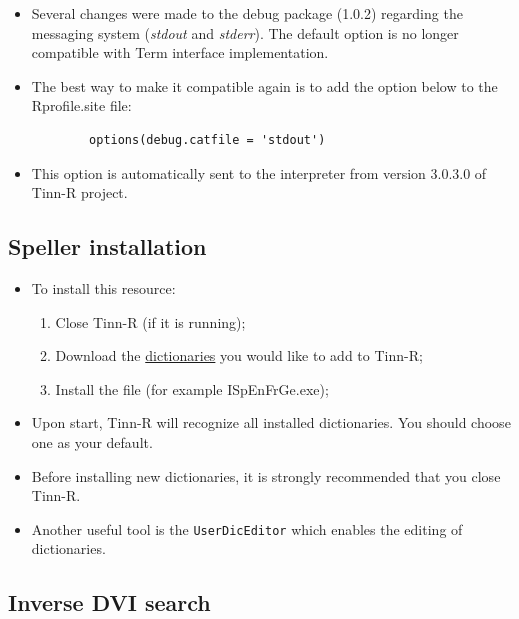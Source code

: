 \begin{itemize}
  \item Several changes were made to the debug package (1.0.2) regarding
    the messaging system (\textit{stdout} and \textit{stderr}). The
    default option is no longer compatible with Term interface
    implementation.
  \item The best way to make it compatible again is to add the option
    below to the Rprofile.site file:

    \begin{footnotesize}
      \begin{verbatim}
        options(debug.catfile = 'stdout')
      \end{verbatim}
    \end{footnotesize}

   \item This option is automatically sent to the \RR{} interpreter from version 3.0.3.0 of Tinn-R project.
\end{itemize}


\hypertarget{configuration_spellerinstalation}{}
\subsection{Speller installation}

\begin{itemize}
  \item To install this resource:
    \begin{enumerate}
      \item Close Tinn-R (if it is running);
      \item Download the
        \href{http://www.luziusschneider.com/Speller/English/index.htm}{dictionaries}
        you would like to add to Tinn-R;
      \item Install the file (for example ISpEnFrGe.exe);
    \end{enumerate}
  \item Upon start, Tinn-R will recognize all installed dictionaries.
    You should choose one as your default.
  \item Before installing new dictionaries, it is strongly
    recommended that you close Tinn-R.
  \item Another useful tool is the \texttt{UserDicEditor} which
    enables the editing of dictionaries.
\end{itemize}


\subsection{Inverse DVI search}

